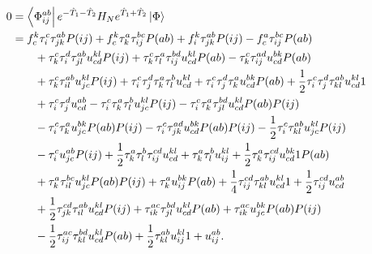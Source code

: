         \begin{align}
            0 & = \bra{\Phi^{ab}_{ij}} e^{-\hat{T}_1 - \hat{T}_2} H_N
            e^{\hat{T}_1 + \hat{T}_2}\ket{\Phi}
            \\
            &=
            f^{k}_{c} \tau^{c}_{i} \tau^{ab}_{jk} P(ij)
            + f^{k}_{c} \tau^{a}_{k} \tau^{bc}_{ij} P(ab)
            + f^{k}_{i} \tau^{ab}_{jk} P(ij)
            - f^{a}_{c} \tau^{bc}_{ij} P(ab)
            \nonumber \\
            &\qquad
            + \tau^{c}_{k} \tau^{d}_{i} \tau^{ab}_{jl} u^{kl}_{cd} P(ij)
            + \tau^{c}_{k} \tau^{a}_{l} \tau^{bd}_{ij} u^{kl}_{cd} P(ab)
            - \tau^{c}_{k} \tau^{ad}_{ij} u^{bk}_{cd} P(ab)
            \nonumber \\
            &\qquad
            + \tau^{c}_{k} \tau^{ab}_{il} u^{kl}_{jc} P(ij)
            + \tau^{c}_{i} \tau^{d}_{j} \tau^{a}_{k} \tau^{b}_{l} u^{kl}_{cd}
            + \tau^{c}_{i} \tau^{d}_{j} \tau^{a}_{k} u^{bk}_{cd} P(ab)
            + \frac{1}{2} \tau^{c}_{i} \tau^{d}_{j} \tau^{ab}_{kl} u^{kl}_{cd} 1
            \nonumber \\
            &\qquad
            + \tau^{c}_{i} \tau^{d}_{j} u^{ab}_{cd}
            - \tau^{c}_{i} \tau^{a}_{k} \tau^{b}_{l} u^{kl}_{jc} P(ij)
            - \tau^{c}_{i} \tau^{a}_{k} \tau^{bd}_{jl} u^{kl}_{cd} P(ab) P(ij)
            \nonumber \\
            &\qquad
            - \tau^{c}_{i} \tau^{a}_{k} u^{bk}_{jc} P(ab) P(ij)
            - \tau^{c}_{i} \tau^{ad}_{jk} u^{bk}_{cd} P(ab) P(ij)
            - \frac{1}{2} \tau^{c}_{i} \tau^{ab}_{kl} u^{kl}_{jc} P(ij)
            \nonumber \\
            &\qquad
            - \tau^{c}_{i} u^{ab}_{jc} P(ij)
            + \frac{1}{2} \tau^{a}_{k} \tau^{b}_{l} \tau^{cd}_{ij} u^{kl}_{cd}
            + \tau^{a}_{k} \tau^{b}_{l} u^{kl}_{ij}
            + \frac{1}{2} \tau^{a}_{k} \tau^{cd}_{ij} u^{bk}_{cd} 1 P(ab)
            \nonumber \\
            &\qquad
            + \tau^{a}_{k} \tau^{bc}_{il} u^{kl}_{jc} P(ab) P(ij)
            + \tau^{a}_{k} u^{bk}_{ij} P(ab)
            + \frac{1}{4} \tau^{cd}_{ij} \tau^{ab}_{kl} u^{kl}_{cd} 1
            + \frac{1}{2} \tau^{cd}_{ij} u^{ab}_{cd}
            \nonumber \\
            &\qquad
            + \frac{1}{2} \tau^{cd}_{jk} \tau^{ab}_{il} u^{kl}_{cd} P(ij)
            + \tau^{ac}_{ik} \tau^{bd}_{jl} u^{kl}_{cd} P(ab)
            + \tau^{ac}_{ik} u^{bk}_{jc} P(ab) P(ij)
            \nonumber \\
            &\qquad
            - \frac{1}{2} \tau^{ac}_{ij} \tau^{bd}_{kl} u^{kl}_{cd} P(ab)
            + \frac{1}{2} \tau^{ab}_{kl} u^{kl}_{ij} 1
            + u^{ab}_{ij}.
        \end{align}
